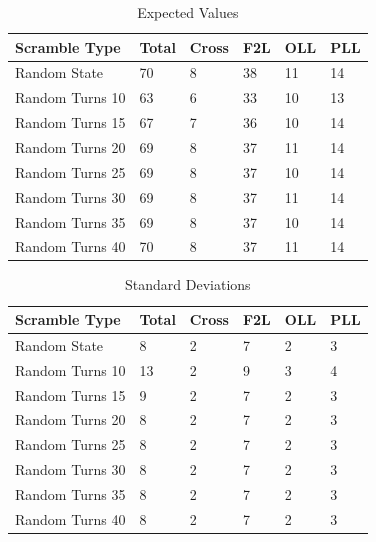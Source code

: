 \documentclass[12pt,letterpaper]{article}
\numberwithin{equation}{section}
\begin{document}
\begin{table}[H]
\centering
\caption{Expected Values}
\begin{tabular}{|p{4cm}|p{1.5cm}|p{1.5cm}|p{1.5cm}|p{1.5cm}|p{1.5cm}|}
\hline
\textbf{Scramble Type} & \textbf{Total} & \textbf{Cross} & \textbf{F2L} & \textbf{OLL} & \textbf{PLL} \\ \hline
Random State & 70 & 8 & 38 & 11 & 14 \\ \hdashline
Random Turns 10 & 63 & 6 & 33 & 10 & 13 \\
Random Turns 15 & 67 & 7 & 36 & 10 & 14 \\
Random Turns 20 & 69 & 8 & 37 & 11 & 14 \\
Random Turns 25 & 69 & 8 & 37 & 10 & 14 \\
Random Turns 30 & 69 & 8 & 37 & 11 & 14 \\
Random Turns 35 & 69 & 8 & 37 & 10 & 14 \\
Random Turns 40 & 70 & 8 & 37 & 11 & 14 \\ \hline
\end{tabular}
\end{table}

\begin{table}[H]
\centering
\caption{Standard Deviations}
\begin{tabular}{|p{4cm}|p{1.5cm}|p{1.5cm}|p{1.5cm}|p{1.5cm}|p{1.5cm}|}
\hline
\textbf{Scramble Type} & \textbf{Total} & \textbf{Cross} & \textbf{F2L} & \textbf{OLL} & \textbf{PLL} \\ \hline
Random State & 8 & 2 & 7 & 2 & 3 \\ \hdashline
Random Turns 10 & 13 & 2 & 9 & 3 & 4 \\
Random Turns 15 & 9 & 2 & 7 & 2 & 3 \\
Random Turns 20 & 8 & 2 & 7 & 2 & 3 \\
Random Turns 25 & 8 & 2 & 7 & 2 & 3 \\
Random Turns 30 & 8 & 2 & 7 & 2 & 3 \\
Random Turns 35 & 8 & 2 & 7 & 2 & 3 \\
Random Turns 40 & 8 & 2 & 7 & 2 & 3 \\ \hline
\end{tabular}
\end{table}
\end{document}
